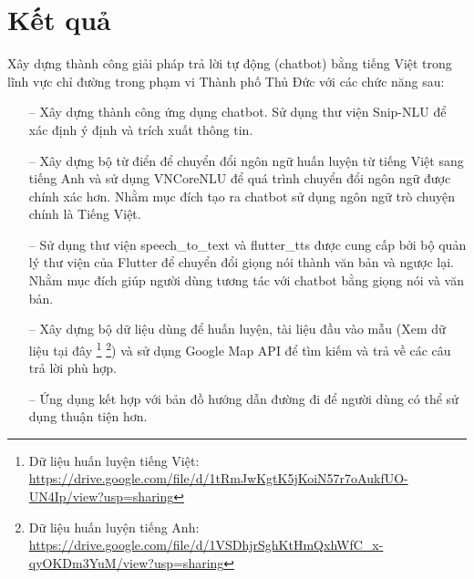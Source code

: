 \section{Kết quả}
Xây dựng thành công giải pháp trả lời tự động (chatbot) bằng tiếng Việt trong lĩnh vực chỉ đường trong phạm vi Thành phố Thủ Đức với các chức năng sau:
\begin{itemize}
    \item[--] Xây dựng thành công ứng dụng chatbot. Sử dụng thư viện Snip-NLU\cite{Snipsnlu} để xác định ý định và trích xuất thông tin.
    \item[--] Xây dựng bộ từ điển để chuyển đổi ngôn ngữ huấn luyện từ tiếng Việt sang tiếng Anh và sử dụng VNCoreNLU\cite{vncorenlu} để quá trình chuyển đổi ngôn ngữ được chính xác hơn. Nhằm mục đích tạo ra chatbot sử dụng ngôn ngữ trò chuyện chính là Tiếng Việt.
    \item[--] Sử dụng thư viện speech\_to\_text\cite{stt} và flutter\_tts\cite{tts} được cung cấp bởi bộ quản lý thư viện của Flutter để chuyển đổi giọng nói thành văn bản và ngược lại. Nhằm mục đích giúp người dùng tương tác với chatbot bằng giọng nói và văn bản.
    \item[--] Xây dựng bộ dữ liệu dùng để huấn luyện, tài liệu đầu vào mẫu (Xem dữ liệu tại đây \footnote{Dữ liệu huấn luyện tiếng Việt: \url{https://drive.google.com/file/d/1tRmJwKgtK5jKoiN57r7oAukfUO-UN4Ip/view?usp=sharing}} \footnote{Dữ liệu huấn luyện tiếng Anh: \url{https://drive.google.com/file/d/1VSDhjrSghKtHmQxhWfC_x-qyOKDm3YuM/view?usp=sharing}}) và sử dụng Google Map API\cite{ggmaps} để tìm kiếm và trả về các câu trả lời phù hợp.
    \item[--] Ứng dụng kết hợp với bản đồ hướng dẫn đường đi để người dùng có thể sử dụng thuận tiện hơn.
\end{itemize}



